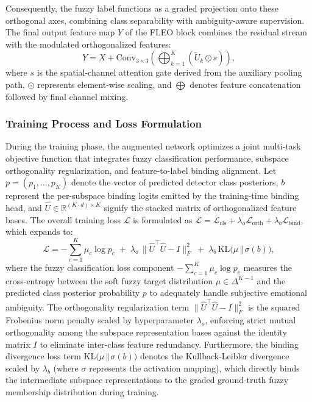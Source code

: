 \documentclass[algorithms,article,submit,moreauthors]{Definitions/mdpi}
\begin{document}
Consequently, the fuzzy label functions as a graded projection onto these orthogonal axes, combining class separability with ambiguity-aware supervision. The final output feature map $Y$ of the FLEO block combines the residual stream with the modulated orthogonalized features:
\begin{equation}
Y = X + \text{Conv}_{3\times3}\left( \bigoplus_{k=1}^{K} \left( \tilde{U}_k \odot s \right) \right),
\label{eq:fleo_output}
\end{equation}
where $s$ is the spatial-channel attention gate derived from the auxiliary pooling path, $\odot$ represents element-wise scaling, and $\bigoplus$ denotes feature concatenation followed by final channel mixing.

\subsubsection{Training Process and Loss Formulation}

During the training phase, the augmented network optimizes a joint multi-task objective function that integrates fuzzy classification performance, subspace orthogonality regularization, and feature-to-label binding alignment. Let $p = (p_1, \dots, p_K)$ denote the vector of predicted detector class posteriors, $b$ represent the per-subspace binding logits emitted by the training-time binding head, and $\hat{U} \in \mathbb{R}^{(K \cdot d) \times K}$ signify the stacked matrix of orthogonalized feature bases. The overall training loss $\mathcal{L}$ is formulated as $\mathcal{L} = \mathcal{L}_{\text{cls}} + \lambda_{o} \mathcal{L}_{\text{orth}} + \lambda_{b} \mathcal{L}_{\text{bind}}$, which expands to:
\begin{equation}
\mathcal{L} = -\sum_{c=1}^{K}\mu_c\log p_c
\;+\;\lambda_{o}\,\bigl\lVert\hat{U}^{\!\top}\hat{U}-I\bigr\rVert_F^{2}
\;+\;\lambda_{b}\,\mathrm{KL}\!\bigl(\mu\,\Vert\,\sigma(b)\bigr),
\label{eq:fuzzyloss}
\end{equation}
where the fuzzy classification loss component $-\sum_{c=1}^{K}\mu_c\log p_c$ measures the cross-entropy between the soft fuzzy target distribution $\mu \in \Delta^{K-1}$ and the predicted class posterior probability $p$ to adequately handle subjective emotional ambiguity. The orthogonality regularization term $\bigl\lVert\hat{U}^{\!\top}\hat{U}-I\bigr\rVert_F^2$ is the squared Frobenius norm penalty scaled by hyperparameter $\lambda_{o}$, enforcing strict mutual orthogonality among the subspace representation bases against the identity matrix $I$ to eliminate inter-class feature redundancy. Furthermore, the binding divergence loss term $\mathrm{KL}\bigl(\mu\,\Vert\,\sigma(b)\bigr)$ denotes the Kullback-Leibler divergence scaled by $\lambda_{b}$ (where $\sigma$ represents the activation mapping), which directly binds the intermediate subspace representations to the graded ground-truth fuzzy membership distribution during training.
\end{document}
